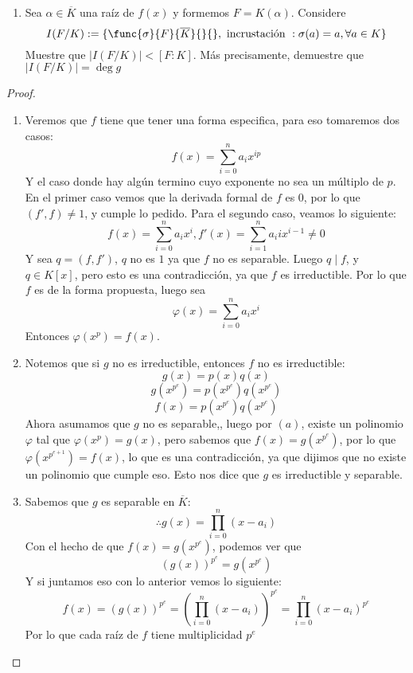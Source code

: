 \documentclass[11pt]{article}
\begin{document}
\begin{enumerate}[label=(\arabic*)]
\begin{enumerate}[label=(\alph*)]
            \item Sea $\alpha\in\overline{K}$ una raíz de $f(x)$ y formemos $F=K(\alpha)$. Considere
            \[I(F/K):=\{\func{\sigma}{F}{\overline{K}}{}{},\text{ incrustación }:\sigma(a)=a,\forall a\in K\}\]
            Muestre que $|I(F/K)|<[F:K]$. Más precisamente, demuestre que $|I(F/K)|=\deg g$
        \end{enumerate}
        \begin{proof}
            \
            \begin{enumerate}[label=(\alph*)]
                \item Veremos que $f$ tiene que tener una forma especifica, para eso tomaremos dos casos:
                \[f(x)=\sum^n_{i=0}a_ix^{ip}\]
                Y el caso donde hay algún termino cuyo exponente no sea un múltiplo de $p$. En el primer caso vemos que la derivada formal de $f$ es $0$, por lo que $(f',f)\neq 1$, y cumple lo pedido. Para el segundo caso, veamos lo siguiente:
                \[f(x)=\sum^{n}_{i=0}a_ix^i, f'(x)=\sum^{n}_{i=1}a_iix^{i-1}\neq 0\]
                Y sea $q=(f,f')$, $q$ no es $1$ ya que $f$ no es separable. Luego $q\mid f$, y $q\in K[x]$, pero esto es una contradicción, ya que $f$ es irreductible. Por lo que $f$ es de la forma propuesta, luego sea
                \[\varphi(x)=\sum^n_{i=0}a_ix^i\]
                Entonces $\varphi(x^p)=f(x)$.

                \item Notemos que si $g$ no es irreductible, entonces $f$ no es irreductible:
                \[g(x)=p(x)q(x)\]
                \[g(x^{p^e})=p(x^{p^e})q(x^{p^e})\]
                \[f(x)=p(x^{p^e})q(x^{p^e})\]
                Ahora asumamos que $g$ no es separable,, luego por $(a)$, existe un polinomio $\varphi$ tal que $\varphi(x^p)=g(x)$, pero sabemos que $f(x)=g(x^{p^e})$, por lo que $\varphi(x^{p^{e+1}})=f(x)$, lo que es una contradicción, ya que dijimos que no existe un polinomio que cumple eso. Esto nos dice que $g$ es irreductible y separable.

                \item Sabemos que $g$ es separable en $\overline{K}$:
                \[\therefore g(x)=\prod^n_{i=0}(x-a_i)\]
                Con el hecho de que $f(x)=g(x^{p^e})$, podemos ver que
                \[(g(x))^{p^e}=g(x^{p^e})\]
                Y si juntamos eso con lo anterior vemos lo siguiente:
                \[f(x)=(g(x))^{p^e}=\left(\prod^n_{i=0}(x-a_i)\right)^{p^e}=\prod^n_{i=0}(x-a_i)^{p^e}\]
                Por lo que cada raíz de $f$ tiene multiplicidad $p^e$


\end{enumerate}
\end{proof}
\end{enumerate}
\end{document}
